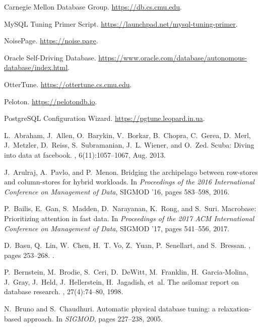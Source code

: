 \documentclass[11pt,times]{article}
\begin{document}
\begin{thebibliography}{10}

{Carnegie Mellon Database Group}.
\newblock \url{https://db.cs.cmu.edu}.

{MySQL Tuning Primer Script}.
\newblock \url{https://launchpad.net/mysql-tuning-primer}.

{NoisePage}.
\newblock \url{https://noise.page}.

{Oracle Self-Driving Database}.
\newblock \url{https://www.oracle.com/database/autonomous-database/index.html}.

{OtterTune}.
\newblock \url{https://ottertune.cs.cmu.edu}.

{Peloton}.
\newblock \url{https://pelotondb.io}.

{PostgreSQL Configuration Wizard}.
\newblock \url{https://pgtune.leopard.in.ua}.

L.~Abraham, J.~Allen, O.~Barykin, V.~Borkar, B.~Chopra, C.~Gerea, D.~Merl,
  J.~Metzler, D.~Reiss, S.~Subramanian, J.~L. Wiener, and O.~Zed.
\newblock Scuba: Diving into data at facebook.
, 6(11):1057--1067, Aug. 2013.

J.~Arulraj, A.~Pavlo, and P.~Menon.
\newblock Bridging the archipelago between row-stores and column-stores for
  hybrid workloads.
\newblock In {\em Proceedings of the 2016 International Conference on
  Management of Data}, SIGMOD '16, pages 583--598, 2016.

P.~Bailis, E.~Gan, S.~Madden, D.~Narayanan, K.~Rong, and S.~Suri.
\newblock Macrobase: Prioritizing attention in fast data.
\newblock In {\em Proceedings of the 2017 ACM International Conference on
  Management of Data}, SIGMOD '17, pages 541--556, 2017.

D.~Basu, Q.~Lin, W.~Chen, H.~T. Vo, Z.~Yuan, P.~Senellart, and S.~Bressan.
, pages 253--268.
.

P.~Bernstein, M.~Brodie, S.~Ceri, D.~DeWitt, M.~Franklin, H.~Garcia-Molina,
  J.~Gray, J.~Held, J.~Hellerstein, H.~Jagadish, et~al.
\newblock The asilomar report on database research.
, 27(4):74--80, 1998.

N.~Bruno and S.~Chaudhuri.
\newblock Automatic physical database tuning: a relaxation-based approach.
\newblock In {\em SIGMOD}, pages 227--238, 2005.


\end{thebibliography}
\end{document}
